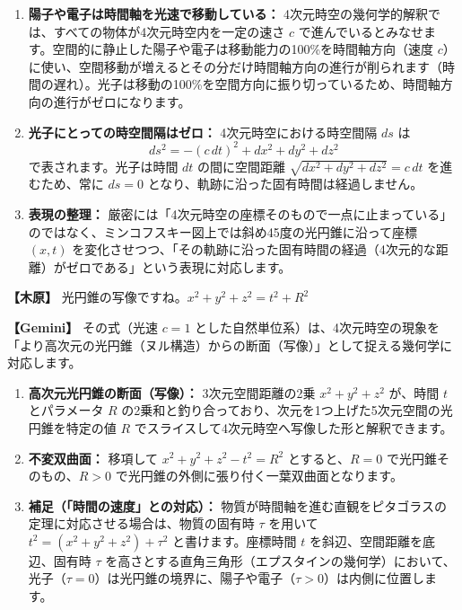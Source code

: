 \documentclass[
  a4paper,
]{ltjsarticle}
\providecommand{\tightlist}{%
  \setlength{\itemsep}{0pt}\setlength{\parskip}{0pt}}
\begin{document}
\begin{enumerate}
\def\labelenumi{\arabic{enumi}.}
\tightlist
\item
  \textbf{陽子や電子は時間軸を光速で移動している：}
  4次元時空の幾何学的解釈では、すべての物体が4次元時空内を一定の速さ
  \(c\)
  で進んでいるとみなせます。空間的に静止した陽子や電子は移動能力の100\%を時間軸方向（速度
  \(c\)）に使い、空間移動が増えるとその分だけ時間軸方向の進行が削られます（時間の遅れ）。光子は移動の100\%を空間方向に振り切っているため、時間軸方向の進行がゼロになります。
\item
  \textbf{光子にとっての時空間隔はゼロ：} 4次元時空における時空間隔
  \(ds\) は \[ds^2 = -(c\,dt)^2 + dx^2 + dy^2 + dz^2\]
  で表されます。光子は時間 \(dt\) の間に空間距離
  \(\sqrt{dx^2 + dy^2 + dz^2} = c\,dt\) を進むため、常に \(ds = 0\)
  となり、軌跡に沿った固有時間は経過しません。
\item
  \textbf{表現の整理：}
  厳密には「4次元時空の座標そのもので一点に止まっている」のではなく、ミンコフスキー図上では斜め45度の光円錐に沿って座標
  \((x, t)\)
  を変化させつつ、「その軌跡に沿った固有時間の経過（4次元的な距離）がゼロである」という表現に対応します。
\end{enumerate}

\textbf{【木原】} 光円錐の写像ですね。\(x^2+y^2+z^2=t^2+R^2\)

\textbf{【Gemini】} その式（光速 \(c = 1\)
とした自然単位系）は、4次元時空の現象を「より高次元の光円錐（ヌル構造）からの断面（写像）」として捉える幾何学に対応します。

\begin{enumerate}
\def\labelenumi{\arabic{enumi}.}
\tightlist
\item
  \textbf{高次元光円錐の断面（写像）：} 3次元空間距離の2乗
  \(x^2+y^2+z^2\) が、時間 \(t\) とパラメータ \(R\)
  の2乗和と釣り合っており、次元を1つ上げた5次元空間の光円錐を特定の値
  \(R\) でスライスして4次元時空へ写像した形と解釈できます。
\item
  \textbf{不変双曲面：} 移項して \(x^2+y^2+z^2-t^2=R^2\)
  とすると、\(R=0\) で光円錐そのもの、\(R>0\)
  で光円錐の外側に張り付く一葉双曲面となります。
\item
  \textbf{補足（「時間の速度」との対応）：}
  物質が時間軸を進む直観をピタゴラスの定理に対応させる場合は、物質の固有時
  \(\tau\) を用いて \(t^2 = (x^2+y^2+z^2) + \tau^2\)
  と書けます。座標時間 \(t\) を斜辺、空間距離を底辺、固有時 \(\tau\)
  を高さとする直角三角形（エプスタインの幾何学）において、光子（\(\tau=0\)）は光円錐の境界に、陽子や電子（\(\tau>0\)）は内側に位置します。
\end{enumerate}
\end{document}

